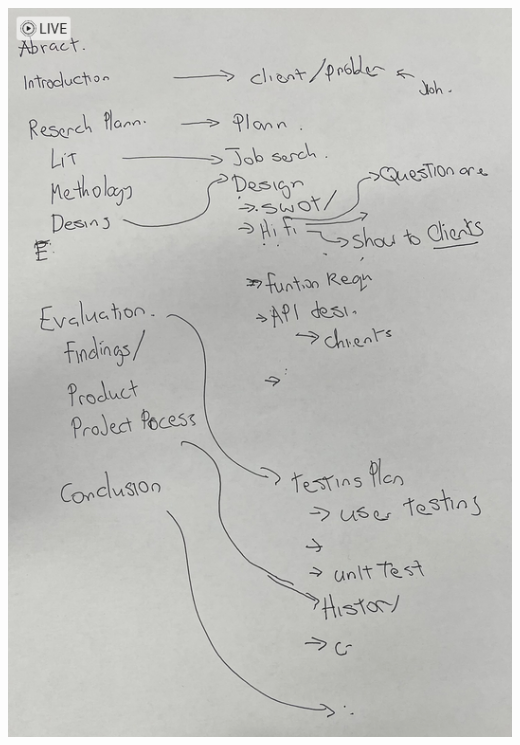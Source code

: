 \documentclass[../CHEFCookingHelperForEveryonesFridge.tex]{subfiles}
\begin{document}
\includegraphics[angle=90,width=\textwidth]{appendicies/report_structure.png}
\end{document}
